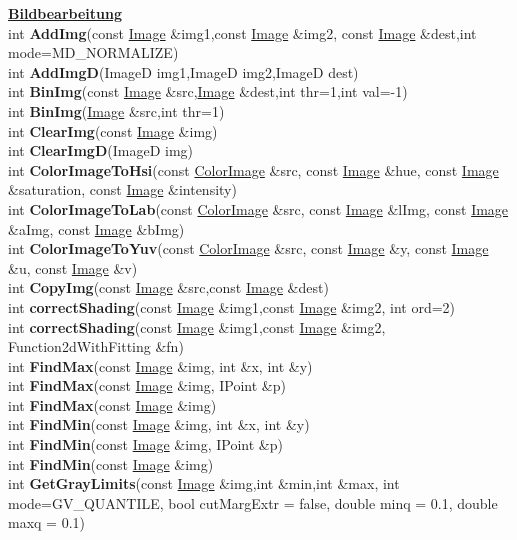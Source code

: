 \documentclass[10pt,titlepage]{article}
\newcommand{\subtitle}[1]{{\noindent\bf#1}}
\def\functionlistentry#1#2#3#4#5#6{\noindent #1 {\bf #2}(#3) \dotfill #6\\}
\begin{document}
{{\subtitle{\hyperlink{SECTION:processing}{Bildbearbeitung}}\\
\functionlistentry{int}{AddImg}{const \hyperlink{Image}{Image} \&img1,const \hyperlink{Image}{Image} \&img2, const \hyperlink{Image}{Image} \&dest,int mode=MD\_NORMALIZE}{1087}{processing}{}
\functionlistentry{int}{AddImgD}{ImageD img1,ImageD img2,ImageD dest}{1098}{processing}{}
\functionlistentry{int}{BinImg}{const \hyperlink{Image}{Image} \&src,\hyperlink{Image}{Image} \&dest,int thr=1,int val=-1}{1064}{processing}{}
\functionlistentry{int}{BinImg}{\hyperlink{Image}{Image} \&src,int thr=1}{1065}{processing}{}
\functionlistentry{int}{ClearImg}{const \hyperlink{Image}{Image} \&img}{1083}{processing}{}
\functionlistentry{int}{ClearImgD}{ImageD img}{1095}{processing}{}
\functionlistentry{int}{ColorImageToHsi}{const \hyperlink{ColorImage}{ColorImage} \&src, const \hyperlink{Image}{Image} \&hue, const \hyperlink{Image}{Image} \&saturation, const \hyperlink{Image}{Image} \&intensity}{1107}{processing}{}
\functionlistentry{int}{ColorImageToLab}{const \hyperlink{ColorImage}{ColorImage} \&src, const \hyperlink{Image}{Image} \&lImg, const \hyperlink{Image}{Image} \&aImg, const \hyperlink{Image}{Image} \&bImg}{1109}{processing}{}
\functionlistentry{int}{ColorImageToYuv}{const \hyperlink{ColorImage}{ColorImage} \&src, const \hyperlink{Image}{Image} \&y, const \hyperlink{Image}{Image} \&u, const \hyperlink{Image}{Image} \&v}{1111}{processing}{}
\functionlistentry{int}{CopyImg}{const \hyperlink{Image}{Image} \&src,const \hyperlink{Image}{Image} \&dest}{1086}{processing}{}
\functionlistentry{int}{correctShading}{const \hyperlink{Image}{Image} \&img1,const \hyperlink{Image}{Image} \&img2, int ord=2}{1081}{processing}{}
\functionlistentry{int}{correctShading}{const \hyperlink{Image}{Image} \&img1,const \hyperlink{Image}{Image} \&img2, Function2dWithFitting \&fn}{1082}{processing}{}
\functionlistentry{int}{FindMax}{const \hyperlink{Image}{Image} \&img, int \&x, int \&y}{1069}{processing}{}
\functionlistentry{int}{FindMax}{const \hyperlink{Image}{Image} \&img, IPoint \&p}{1070}{processing}{}
\functionlistentry{int}{FindMax}{const \hyperlink{Image}{Image} \&img}{1071}{processing}{}
\functionlistentry{int}{FindMin}{const \hyperlink{Image}{Image} \&img, int \&x, int \&y}{1066}{processing}{}
\functionlistentry{int}{FindMin}{const \hyperlink{Image}{Image} \&img, IPoint \&p}{1067}{processing}{}
\functionlistentry{int}{FindMin}{const \hyperlink{Image}{Image} \&img}{1068}{processing}{}
\functionlistentry{int}{GetGrayLimits}{const \hyperlink{Image}{Image} \&img,int \&min,int \&max, int mode=GV\_QUANTILE, bool cutMargExtr = false, double minq = 0.1, double maxq = 0.1}{1072}{processing}{}
}}
\end{document}
